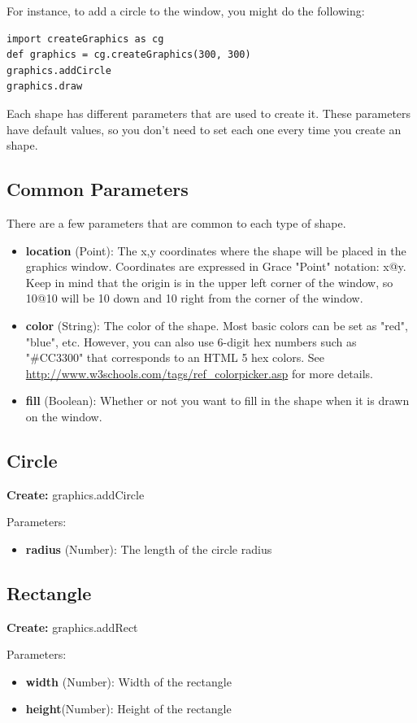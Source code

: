 \documentclass{article}
\begin{document}
For instance, to add a circle to the window, you might do the following:
\begin{lstlisting}
import createGraphics as cg
def graphics = cg.createGraphics(300, 300)
graphics.addCircle
graphics.draw
\end{lstlisting}
Each shape has different parameters that are used to create it. These parameters have default values, so you don't need to set each
one every time you create an shape.

\subsection{Common Parameters}
There are a few parameters that are common to each type of shape.

\begin{itemize}
\item \textbf{location} (Point): The x,y coordinates where the shape will be placed in the graphics window. Coordinates are expressed in Grace "Point" notation: x@y. Keep in mind that the origin is in the upper left corner of the window, so 10@10 will be 10 down and 10 right from the corner of the window.
\item \textbf{color} (String): The color of the shape. Most basic colors can be set as "red", "blue", etc. However, you can also use 6-digit hex numbers 
such as "\#CC3300" that corresponds to an HTML 5 hex colors. See \url{http://www.w3schools.com/tags/ref_colorpicker.asp} for more details.
\item \textbf{fill} (Boolean): Whether or not you want to fill in the shape when it is drawn on the window.
\end{itemize}

\subsection{Circle}
\textbf{Create:} graphics.addCircle

Parameters:
\begin{itemize}
\item \textbf{radius} (Number): The length of the circle radius
\end{itemize}

\subsection{Rectangle}
\textbf{Create:} graphics.addRect

Parameters:
\begin{itemize}
\item \textbf{width} (Number): Width of the rectangle
\item \textbf{height}(Number): Height of the rectangle
\end{itemize}
\end{document}

